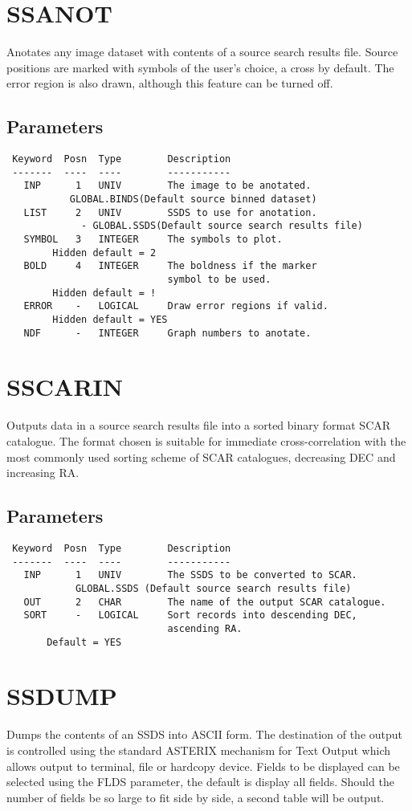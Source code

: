 \documentclass{book}
\renewcommand{\_}{{\tt\char'137}}     %
\begin{document}
\section{SSANOT}
Anotates any image dataset with contents of a source search results
file. Source positions are marked with symbols of the user's
choice, a cross by default. The error region is also drawn, although
this feature can be turned off.

\subsection{Parameters}
\begin{verbatim}
 Keyword  Posn  Type        Description
 -------  ----  ----        -----------
   INP      1   UNIV        The image to be anotated.
           GLOBAL.BINDS(Default source binned dataset)
   LIST     2   UNIV        SSDS to use for anotation.
             - GLOBAL.SSDS(Default source search results file)
   SYMBOL   3   INTEGER     The symbols to plot.
        Hidden default = 2
   BOLD     4   INTEGER     The boldness if the marker
                            symbol to be used.
        Hidden default = !
   ERROR    -   LOGICAL     Draw error regions if valid.
        Hidden default = YES
   NDF      -   INTEGER     Graph numbers to anotate.

\end{verbatim}\section{SSCARIN}
Outputs data in a source search results file into a sorted binary
format SCAR catalogue. The format chosen is suitable for immediate
cross-correlation with the most commonly used sorting scheme of
SCAR catalogues, decreasing DEC and increasing RA.
\subsection{Parameters}
\begin{verbatim}
 Keyword  Posn  Type        Description
 -------  ----  ----        -----------
   INP      1   UNIV        The SSDS to be converted to SCAR.
            GLOBAL.SSDS (Default source search results file)
   OUT      2   CHAR        The name of the output SCAR catalogue.
   SORT     -   LOGICAL     Sort records into descending DEC,
                            ascending RA.
       Default = YES

\end{verbatim}\section{SSDUMP}
Dumps the contents of an SSDS into ASCII form. The destination
of the output is controlled using the standard ASTERIX mechanism
for Text Output which allows output to terminal, file or
hardcopy device.
Fields to be displayed can be selected using the FLDS parameter,
the default is display all fields. Should the number of fields
be so large to fit side by side, a second table will be output.
\end{document}
